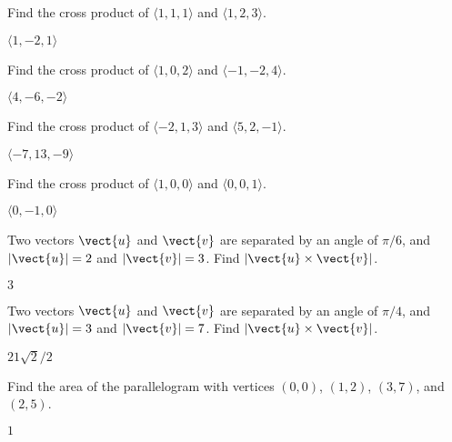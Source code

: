 \begin{enumialphparenastyle}

\begin{ex}
Find the cross product of $\langle 1,1,1\rangle$ and 
$\langle 1,2,3\rangle$. 
\begin{sol}
	$\langle 1,-2,1\rangle$
\end{sol}
\end{ex}

\begin{ex}
Find the cross product of $\langle 1,0,2\rangle$ and 
$\langle -1,-2,4\rangle$. 
\begin{sol}
	$\langle 4,-6,-2\rangle$
\end{sol}
\end{ex}

\begin{ex}
Find the cross product of $\langle -2,1,3\rangle$ and 
$\langle 5,2,-1\rangle$. 
\begin{sol}
	$\langle -7,13,-9\rangle$
\end{sol}
\end{ex}

\begin{ex}
Find the cross product of $\langle 1,0,0\rangle$ and 
$\langle 0,0,1\rangle$. 
\begin{sol}
	$\langle 0,-1,0\rangle$
\end{sol}
\end{ex}

\begin{ex}
Two vectors $\vect{u}$ and $\vect{v}$ are separated by an
angle of $\pi/6$, and $|\vect{u}|=2$ and $|\vect{v}|=3$. Find $|\vect{u}\times\vect{v}|$.
\begin{sol}
	$3$
\end{sol}
\end{ex}

\begin{ex}
Two vectors $\vect{u}$ and $\vect{v}$ are separated by an
angle of $\pi/4$, and $|\vect{u}|=3$ and $|\vect{v}|=7$. Find 
$|\vect{u}\times\vect{v}|$.
\begin{sol}
	$21\sqrt2/2$
\end{sol}
\end{ex}

\begin{ex}
Find the area of the parallelogram with vertices $(0,0)$, $(1,2)$,
$(3,7)$, and $(2,5)$.
\begin{sol}
	$1$
\end{sol}
\end{ex}


\end{enumialphparenastyle}

